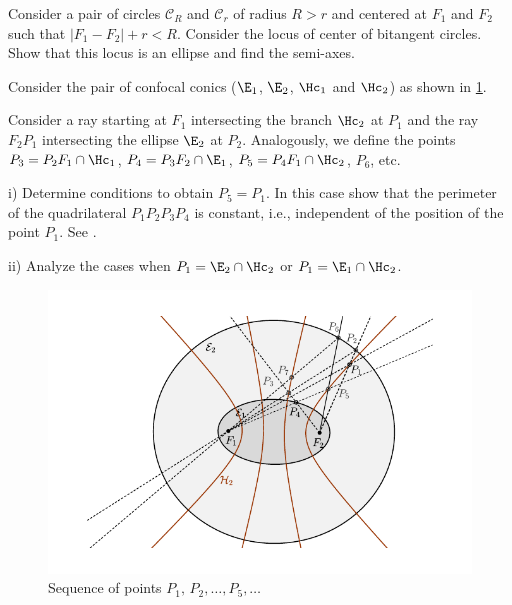 
\begin{exercise} Consider a pair of circles $\mathcal{C}_R$ and $\mathcal{C}_r$ of radius $R>r$ and centered at $F_1$ and $F_2$ such that $|F_1-F_2|+r<R$. Consider the locus of center of bitangent circles. Show that this locus is an ellipse and find the semi-axes.
   
\end{exercise}

\begin{exercise}

\label{exerc:08-02-periodicsequence}
Consider the pair of confocal conics ($\E_1$, $\E_2$, $\Hc_1$ and $\Hc_2$) as shown in  \cref{fig:retangulo_exerc82}.

  Consider a ray starting at $F_1$ intersecting the branch $\Hc_2$ at $P_1$ and  the ray
  $F_2P_1$  intersecting the ellipse $\E_2$  at $P_2$. Analogously, we define the points $P_3=P_2F_1\cap\Hc_1$, $P_4=P_3F_2\cap\E_1$, $P_5=P_4F_1\cap\Hc_2$,
  $P_6$, etc.  
  
\noindent i) Determine conditions to obtain $P_5=P_1$. 
In this case show that the perimeter of the quadrilateral
$P_1P_2P_3P_4$ is constant, i.e., independent of the position of the point $P_1$.  See \cite{dolgirev2014}.


\noindent ii) Analyze the cases when $P_1=\E_2\cap \Hc_2$ or $P_1=\E_1\cap \Hc_2$.

 \begin{figure}[H]
 	\begin{center}
 	 \includegraphics[scale=1]{chap_09/pics/pics_09_910_dinamica_retangulos.pdf}
 		\caption {Sequence of points $P_1,  \,P_2, \ldots,  P_5 ,  \ldots$  
 		 \label{fig:retangulo_exerc82} }
 	\end{center}
 	\end{figure}
 	
 	\end{exercise}
 	
